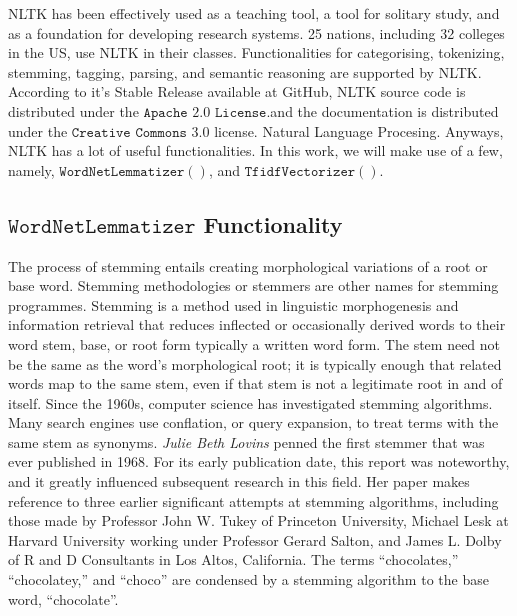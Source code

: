 \documentclass[sn-basic]{sn-jnl}%
\theoremstyle{thmstyleone}%
\theoremstyle{thmstyletwo}%
\theoremstyle{thmstylethree}%
\begin{document}
NLTK has been effectively used as a teaching tool, a tool for solitary study, and as a foundation for developing research systems. 25 nations, including 32 colleges in the US, use NLTK in their classes. Functionalities for categorising, tokenizing, stemming, tagging, parsing, and semantic reasoning are supported by NLTK. According to it's Stable Release available at GitHub, NLTK source code is distributed under the $\mathtt{Apache}$  $\mathtt{2.0}$ $\mathtt{License}$.and the documentation is distributed under the $\mathtt{Creative}$ $\mathtt{Commons}$ $\mathtt{3.0}$ license. Natural Language Procesing. Anyways, NLTK has a lot of useful functionalities. In this work, we will make use of a few, namely, $\mathtt{WordNetLemmatizer()}$, and $\mathtt{TfidfVectorizer()}$. 
\subsection{$\mathtt{WordNetLemmatizer}$ Functionality}
The process of stemming entails creating morphological variations of a root or base word. Stemming methodologies or stemmers are other names for stemming programmes. Stemming is a method used in linguistic \cite{bromham2022global} morphogenesis and information retrieval that reduces inflected or occasionally derived words to their word stem, base, or root form typically a written word form. The stem need not be the same as the word's morphological root; it is typically enough that related words map to the same stem, even if that stem is not a legitimate root in and of itself. Since the 1960s, computer science has investigated stemming algorithms. Many search engines use conflation, or query expansion, to treat terms with the same stem as synonyms. \textit{Julie Beth Lovins} penned the first stemmer that was ever published in 1968. For its early publication date, this report was noteworthy, and it greatly influenced subsequent research in this field. Her paper makes reference to three earlier significant attempts at stemming algorithms, including those made by Professor John W. Tukey of Princeton University, Michael Lesk at Harvard University working under Professor Gerard Salton, and James L. Dolby of R and D Consultants in Los Altos, California. The terms “chocolates,” “chocolatey,” and “choco” are condensed by a stemming algorithm to the base word, “chocolate”. 
\end{document}
